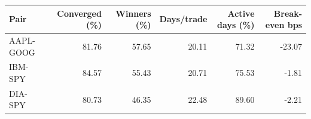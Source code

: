 \begin{tabular}{@{}lrrrrr@{}}
\toprule
Pair & Converged (\%) & Winners (\%) & Days/trade & Active days (\%) & Break-even bps \\
\midrule
AAPL-GOOG & 81.76 & 57.65 & 20.11 & 71.32 & -23.07 \\
IBM-SPY & 84.57 & 55.43 & 20.71 & 75.53 & -1.81 \\
DIA-SPY & 80.73 & 46.35 & 22.48 & 89.60 & -2.21 \\
\bottomrule
\end{tabular}
